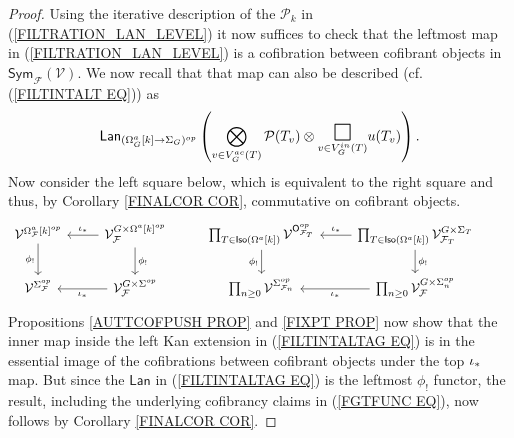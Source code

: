 \documentclass[a4paper,10pt]{article}%
\begin{document}
\begin{proof}
Using the iterative description 
of the $\mathcal{P}_k$ in
(\ref{FILTRATION_LAN_LEVEL})
it now suffices
to check that the leftmost map in (\ref{FILTRATION_LAN_LEVEL}) is
a cofibration between cofibrant objects in 
$\mathsf{Sym}_{\mathcal{F}}(\mathcal{V})$.
We now recall that that map can also be described 
(cf. (\ref{FILTINTALT EQ})) as
\begin{equation}\label{FILTINTALTAG EQ}
	\mathsf{Lan}_{(\Omega_{G}^a[k] \to \Sigma_G)^{op}}
	\left(
		\bigotimes\limits_{v \in V_{G}^{ac}(T)}\P(T_v) \otimes
		\underset{v \in V_{G}^{in}(T)}
{\mathlarger{\mathlarger{\mathlarger{\square}}}}
		u(T_v)
	\right).
\end{equation}
Now consider the left square below, which is equivalent to the right square and thus, 
by Corollary \ref{FINALCOR COR},
commutative on cofibrant objects.
\[
\begin{tikzcd}
	\mathcal{V}^{\Omega_{\mathcal{F}}^a[k]^{op}} \ar{d}[swap]{\phi_!} &
	\mathcal{V}^{G \times \Omega^a[k]^{op}}_{\mathcal{F}} 
	\ar{l}[swap]{\iota_{\**}} \ar{d}{\phi_!} 
&
	\prod_{T \in \mathsf{Iso}(\Omega^a[k])}
\mathcal{V}^{\mathsf{O}^{op}_{\mathcal{F}_T}} \ar{d}[swap]{\phi_!} &
	\prod_{T \in \mathsf{Iso}(\Omega^a[k])}
\mathcal{V}^{G \times \Sigma_T}_{\mathcal{F}_T}
	\ar{l}[swap]{\iota_{\**}} \ar{d}{\phi_!} &
\\
	\mathcal{V}^{\Sigma_{\mathcal{F}}^{op}}  &
	\mathcal{V}^{G \times \Sigma^{op}}_{\mathcal{F}}
	\ar{l}{\iota_{\**}}
&
	\prod_{n \geq 0}
	\mathcal{V}^{\Sigma_{\mathcal{F}_n}^{op}}  &
	\prod_{n \geq 0}
	\mathcal{V}^{G \times \Sigma_n^{op}}_{\mathcal{F}}
	\ar{l}{\iota_{\**}}&
\end{tikzcd}
\]
Propositions \ref{AUTTCOFPUSH PROP}
and \ref{FIXPT PROP} 
now show that the inner map inside the left Kan extension in (\ref{FILTINTALTAG EQ})
is in the essential image 
of the cofibrations between cofibrant objects
under the top $\iota_{\**}$ map.
But since the 
$\mathsf{Lan}$ in (\ref{FILTINTALTAG EQ})
is the leftmost $\phi_!$ functor, the
result, including the underlying cofibrancy claims in (\ref{FGTFUNC EQ}), now follows by 
Corollary \ref{FINALCOR COR}.
%
%

\end{proof}
\end{document}
